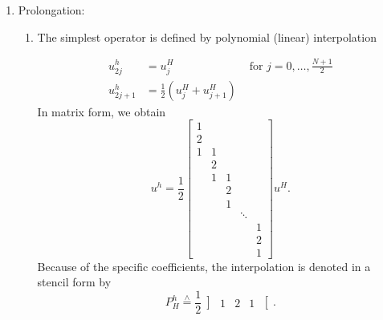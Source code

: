 \begin{enumerate}[label=\Alph{enumi})]
	\item Prolongation:
		\begin{enumerate}[label=\underline{\arabic{enumi}D}]
			\item The simplest operator is defined by polynomial (linear) interpolation
		
		\begin{align*}
			u_{2j}^{h} &= u_{j}^{H}  &\text{ for } j=0, \ldots, \frac{N+1}{2} \\
			u_{2j+1}^{h} &= \frac{1}{2}(u_{j}^{H}+u_{j+1}^{H})
		\end{align*}
		In matrix form, we obtain
		\[
		u^{h}= \frac{1}{2}\begin{bmatrix}
			1& & & & \\
			2& & & & \\
			1&1& & & \\
			 &2& & & \\
			 &1&1& & \\
			 & &2& & \\
			 & &1& & \\
			 & & &\ddots& \\
			 & & & &1 \\
			 & & & &2 \\
			 & & & &1
		\end{bmatrix}u^{H}
		.\] 
		Because of the specific coefficients, the interpolation is denoted in a stencil form by
		\[
			P_{H}^{h} \overset{\wedge}{=} \frac{1}{2}
			\left]
			\begin{matrix}
				1 & 2 & 1	
			\end{matrix}
			\right[
		.\] 


\end{enumerate}
\end{enumerate}
